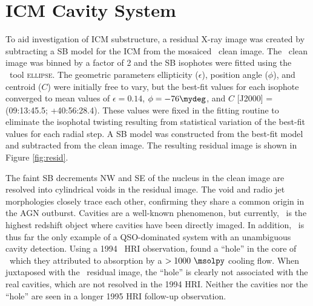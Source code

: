 \documentclass[useAMS,usenatbib]{mn2e}
\begin{document}
\section{ICM Cavity System}
\label{sec:cavs}

To aid investigation of ICM substructure, a residual X-ray image was
created by subtracting a SB model for the ICM from the mosaiced
\chandra\ clean image. The \chandra\ clean image was binned by a
factor of 2 and the SB isophotes were fitted using the \iraf\ tool
\textsc{ellipse}. The geometric parameters ellipticity ($\epsilon$),
position angle ($\phi$), and centroid ($C$) were initially free to
vary, but the best-fit values for each isophote converged to mean
values of $\epsilon = 0.14$, $\phi = -76\mydeg$, and $C$ [J2000] =
(09:13:45.5; +40:56:28.4). These values were fixed in the fitting
routine to eliminate the isophotal twisting resulting from statistical
variation of the best-fit values for each radial step. A SB model was
constructed from the best-fit model and subtracted from the clean
image. The resulting residual image is shown in Figure
\ref{fig:resid}.

The faint SB decrements NW and SE of the nucleus in the clean image
are resolved into cylindrical voids in the residual image. The void
and radio jet morphologies closely trace each other, confirming they
share a common origin in the AGN outburst. Cavities are a well-known
phenomenon, but currently, \irs\ is the highest redshift object where
cavities have been directly imaged. In addition, \irs\ is thus far the
only example of a QSO-dominated system with an unambiguous cavity
detection. Using a 1994 \rosat\ HRI observation,
\citet{1995MNRAS.274L..63F} found a ``hole'' in the core of
\rxj\ which they attributed to absorption by a $> 1000 ~\msolpy$
cooling flow. When juxtaposed with the \chandra\ residual image, the
``hole'' is clearly not associated with the real cavities, which are
not resolved in the 1994 HRI. Neither the cavities nor the ``hole''
are seen in a longer 1995 HRI follow-up observation.
\end{document}
